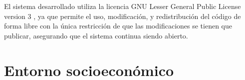 El sistema desarrollado utiliza la licencia GNU Lesser General Public License
version 3 \parencite{lgpl}, ya que permite el uso, modificación, y
redistribución del código de forma libre con la única restricción de que las
modificaciones se tienen que publicar, asegurando que el sistema continua siendo
abierto.

\section{Entorno socioeconómico}
